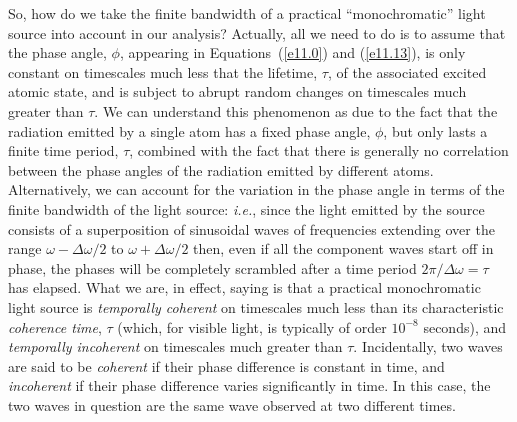 So, how do we take the finite bandwidth of  a practical ``monochromatic'' light source into account in our analysis? Actually,
all we need to do is to assume that the phase angle, $\phi$, appearing in Equations~(\ref{e11.0}) and (\ref{e11.13}), is
only constant on timescales much less that the lifetime, $\tau$, of the associated excited atomic state, and is subject to abrupt random changes on timescales much
greater than $\tau$. We can understand this phenomenon as due to the fact that the radiation emitted by a single atom  has a
fixed phase angle, $\phi$, but only lasts a finite time period, $\tau$, combined with the fact that there is generally no correlation between the
phase angles of the radiation emitted by different atoms. Alternatively, we can account for the variation in the phase
angle in terms of the finite bandwidth of the light source: {\em i.e.}, since the light emitted by the source consists of a superposition of sinusoidal waves of
frequencies extending over the range $\omega-\Delta\omega/2$ to $\omega+\Delta\omega/2$ then, even if all the
component waves start off in phase, the phases will be completely scrambled after a time  period $2\pi/\Delta\omega = \tau$ has
elapsed. What we are, in effect, saying is that a practical monochromatic light source is {\em temporally coherent}\/ on timescales
much less than its characteristic {\em coherence time}, $\tau$ (which, for visible light,  is typically
of order  $10^{-8}$ seconds), and {\em temporally incoherent}\/ on timescales much greater than $\tau$. Incidentally, two waves are said
to be {\em coherent}\/ if their phase difference is constant in time, and {\em incoherent}\/ if their phase difference varies
significantly in time. In this case, the
two waves in question are the same wave observed  at two different times. 

